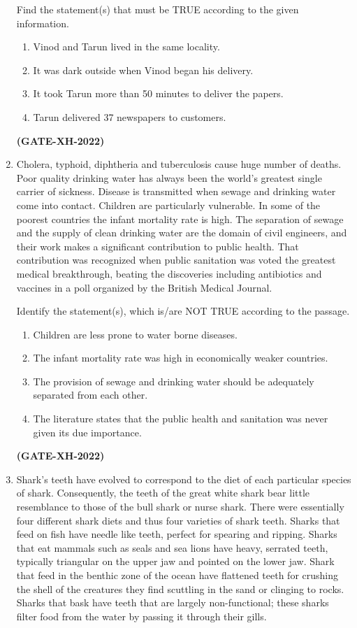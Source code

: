 \documentclass[journal]{IEEEtran}
\begin{document}
\begin{enumerate}
Find the statement(s) that must be TRUE according to the given information.

\begin{enumerate}
\item Vinod and Tarun lived in the same locality.
\item It was dark outside when Vinod began his delivery.
\item It took Tarun more than 50 minutes to deliver the papers.
\item Tarun delivered 37 newspapers to customers.
\end{enumerate}
\hfill\textbf{(GATE-XH-2022)}
\item Cholera, typhoid, diphtheria and tuberculosis cause huge number of deaths. Poor quality drinking water has always been the world’s greatest single carrier of sickness. Disease is transmitted when sewage and drinking water come into contact. Children are particularly vulnerable. In some of the poorest countries the infant mortality rate is high. The separation of sewage and the supply of clean drinking water are the domain of civil engineers, and their work makes a significant contribution to public health. That contribution was recognized when public sanitation was voted the greatest medical breakthrough, beating the discoveries including antibiotics and vaccines in a poll organized by the British Medical Journal.

Identify the statement(s), which is/are NOT TRUE according to the passage.

\begin{enumerate}
\item Children are less prone to water borne diseases.
\item The infant mortality rate was high in economically weaker countries.
\item The provision of sewage and drinking water should be adequately separated from each other.
\item The literature states that the public health and sanitation was never given its due importance.
\end{enumerate}
\hfill\textbf{(GATE-XH-2022)}
\item Shark’s teeth have evolved to correspond to the diet of each particular species of shark. Consequently, the teeth of the great white shark bear little resemblance to those of the bull shark or nurse shark. There were essentially four different shark diets and thus four varieties of shark teeth. Sharks that feed on fish have needle like teeth, perfect for spearing and ripping. Sharks that eat mammals such as seals and sea lions have heavy, serrated teeth, typically triangular on the upper jaw and pointed on the lower jaw. Shark that feed in the benthic zone of the ocean have flattened teeth for crushing the shell of the creatures they find scuttling in the sand or clinging to rocks. Sharks that bask have teeth that are largely non-functional; these sharks filter food from the water by passing it through their gills.


\end{enumerate}
\end{document}
